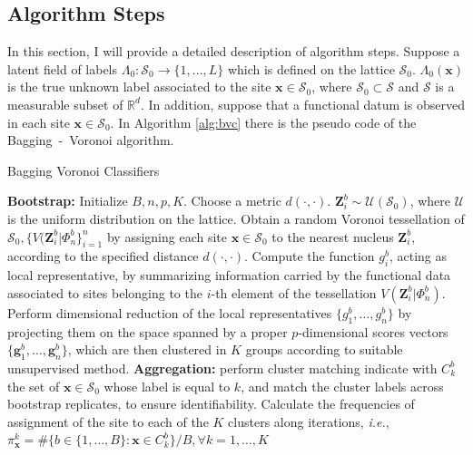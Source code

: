 \subsection{Algorithm Steps}
\label{subsec:algsteps}
In this section, I will provide a detailed description of algorithm steps.
Suppose a latent field of labels $\Lambda_0:\mathcal{S}_0 \rightarrow \{1,\dots,L\}$ which is defined on the lattice $\mathcal{S}_0$. $\Lambda_0(\mathbf{x})$ is the true unknown label associated to the site $\mathbf{x}\in\mathcal{S}_0$, where $\mathcal{S}_0 \subset \mathcal{S}$ and $\mathcal{S}$ is a measurable subset of $\mathbb{R}^d$. In addition, suppose that a functional datum is observed in each site $\mathbf{x}\in\mathcal{S_0}$. In Algorithm \ref{alg:bvc} there is the pseudo code of the Bagging~-~Voronoi algorithm.

\begin{algorithm}
\scriptsize
    \caption{\footnotesize{Bagging Voronoi Classifiers}}
    \label{alg:bvc}
    \begin{algorithmic}
    \STATE \textbf{Bootstrap:}
    \STATE Initialize $B, n, p, K$. Choose a metric $d(\cdot,\cdot).$
    \STATE $\mathbf{Z}_i^b\sim\mathcal{U}(\mathcal{S}_0)$, where $\mathcal{U}$ is the uniform distribution on the lattice. Obtain a random Voronoi tessellation of $\mathcal{S}_0, \{V(\mathbf{Z}_i^b|\Phi_n^b\}^n_{i=1}$ by assigning each site $\mathbf{x}\in \mathcal{S}_0$ to the nearest nucleus $\mathbf{Z}_i^b$, according to the specified distance $d(\cdot,\cdot).$
    \ENDFOR
    \STATE Compute the function $g_i^b$, acting as local representative, by summarizing information carried by the functional data associated to sites belonging to the $i$-th element of the tessellation $V(\mathbf{Z}_i^b|\Phi_n^b)$.
    \ENDFOR
    \STATE Perform dimensional reduction of the local representatives $\{g_1^b,\dots, g_n^b\}$ by projecting them on the space spanned by a proper $p$-dimensional scores vectors $\{\mathbf{g}_1^b,\dots, \mathbf{g}_n^b\}$, which are then clustered in $K$ groups according to suitable unsupervised method.
    \ENDFOR
    \STATE \textbf{Aggregation:} perform cluster matching
    \STATE indicate with $C_k^b$ the set of $\mathbf{x} \in \mathcal{S}_0$ whose label is equal to $k$, and match the cluster labels across bootstrap replicates, to ensure identifiability.
    \ENDFOR
    \ENDFOR
    \STATE Calculate the frequencies of assignment of the site to each of the $K$ clusters along iterations, \textit{i.e.}, $\pi_{\mathbf{x}}^k=\#\{b\in\{1,\dots,B\}:\mathbf{x}\in C_k^b\}/B, \forall k=1,\dots,K$
    \ENDFOR
    \end{algorithmic}
\end{algorithm} 


